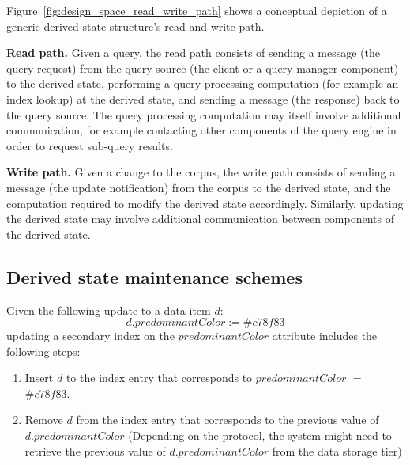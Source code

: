 \noindent
Figure~\ref{fig:design_space_read_write_path} shows a conceptual depiction of a generic derived state structure's read
and write path.

\textbf{Read path.}
Given a query, the read path consists of sending a message (the query request) from the query source (the client or a query manager component)
to the derived state, performing a query processing computation (for example an index lookup) at the derived state,
and sending a message (the response) back to the query source.
The query processing computation may itself involve additional communication, for example contacting other components of
the query engine in order to request sub-query results.

\textbf{Write path.}
Given a change to the corpus,
the write path consists of sending a message (the update notification) from the corpus to the derived state,
and the computation required to modify the derived state accordingly.
Similarly, updating the derived state may involve additional communication between components of the derived state.


\subsection{Derived state maintenance schemes}
\label{sec:sync_async_maintenance}


Given the following update to a data item $d$:
\[
d.predominantColor := \#c78f83
\]
updating a secondary index on the $predominantColor$ attribute includes the following steps:
\begin{sloppypar}
\begin{enumerate}
  \item Insert $d$ to the index entry that corresponds to $predominantColor$ $=$ $\#c78f83$.
  \item Remove $d$ from the index entry that corresponds to the previous value of $d.predominantColor$
  (Depending on the protocol, the system might need to retrieve the previous value of $d.predominantColor$ from the data
  storage tier)
\end{enumerate}
\end{sloppypar}

